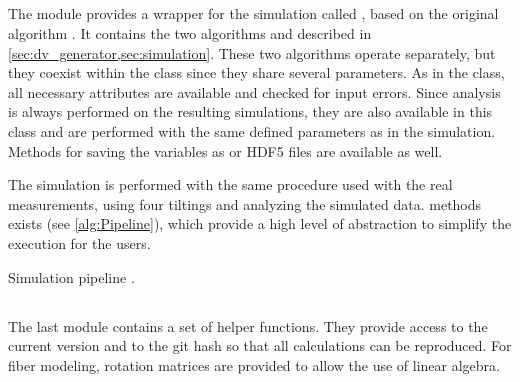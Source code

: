 \subsection{}
% 
The  module provides a wrapper for the simulation called , based on the original algorithm \cite{Dohmen2015,Lucksch2016}.
It contains the two algorithms  and  described in \cref{sec:dv_generator,sec:simulation}.
These two algorithms operate separately, but they coexist within the class since they share several parameters. 
As in the  class, all necessary attributes are available and checked for input errors.
Since analysis is always performed on the resulting simulations, they are also available in this class and are performed with the same defined parameters as in the simulation.
Methods for saving the variables as  or \ac{HDF5} files are available as well.
\par
% 
The simulation is performed with the same procedure used with the real measurements, using four tiltings and analyzing the simulated data.
 methods exists (see \cref{alg:Pipeline}), which provide a high level of abstraction to simplify the execution for the users.
%
\begin{lstfloat}[!tb]
\centering
\scalebox{0.75}{
\begin{minipage}{\the\textwidth}

\end{minipage}}
\caption{Simulation pipeline .}
\label{alg:Pipeline}
\end{lstfloat}
%
% 
%
\subsection{}
% 
The last module contains a set of helper functions.
They provide access to the current version and  to the git hash so that all calculations can be reproduced.
For fiber modeling, rotation matrices are provided to allow the use of linear algebra.
% 
% 
% 
